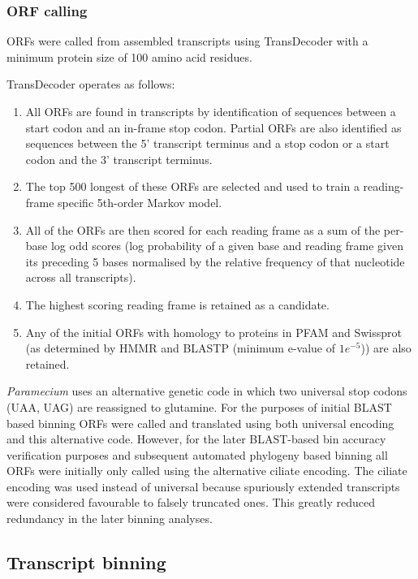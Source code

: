 \subsubsection{ORF calling}

ORFs were called from assembled transcripts using TransDecoder \citep{Haas2013} with 
a minimum protein size of 100 amino acid residues.

TransDecoder operates as follows:
\begin{enumerate}
    \item All ORFs are found in transcripts by identification of sequences
        between a start codon and an in-frame stop codon. Partial ORFs are also
        identified as sequences between the 5' transcript terminus and a stop codon
        or a start codon and the 3' transcript terminus.
    \item The top 500 longest of these ORFs are selected and used to train a 
        reading-frame specific 5th-order Markov model.
    \item All of the ORFs are then scored for each reading frame
        as a sum of the per-base log odd scores
        (log probability of a given base and reading frame given its preceding
        5 bases normalised by the relative frequency of that nucleotide
        across all transcripts).
    \item The highest scoring reading frame is retained as a candidate.
        
     \item Any of the initial ORFs with homology to proteins in PFAM and Swissprot (as determined by HMMR
        and BLASTP (minimum e-value of \(1e^{-5}\))) are also retained.
\end{enumerate}




\textit{Paramecium} uses an alternative
genetic code in which two universal stop codons (UAA, UAG) are reassigned to glutamine.
For the purposes of initial BLAST based binning ORFs were called and translated
using both universal encoding and this alternative code. However, for 
the later BLAST-based bin accuracy verification purposes and subsequent
automated phylogeny based binning all ORFs were initially only called using 
the alternative ciliate encoding. The ciliate encoding was used
instead of universal because spuriously extended transcripts
were considered favourable to falsely truncated ones.
This greatly reduced redundancy in the later binning analyses.

\subsection{Transcript binning}

